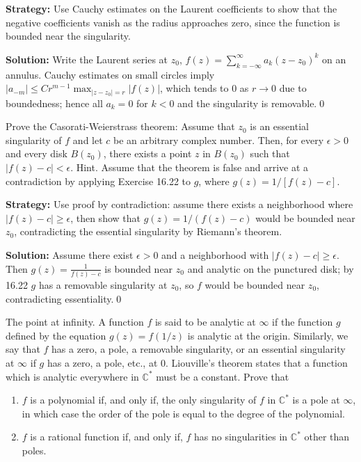 \noindent\textbf{Strategy:} Use Cauchy estimates on the Laurent coefficients to show that the negative coefficients vanish as the radius approaches zero, since the function is bounded near the singularity.

\bigskip\noindent\textbf{Solution:}
Write the Laurent series at $z_0$, $f(z)=\sum_{k=-\infty}^{\infty} a_k(z-z_0)^k$ on an annulus. Cauchy estimates on small circles imply $|a_{-m}|\le C r^{m-1}\max_{|z-z_0|=r}|f(z)|$, which tends to $0$ as $r\to0$ due to boundedness; hence all $a_{k}=0$ for $k<0$ and the singularity is removable.\qed


\begin{problembox}
\begin{problemstatement}
Prove the Casorati-Weierstrass theorem: Assume that \( z_0 \) is an essential singularity of \( f \) and let \( c \) be an arbitrary complex number. Then, for every \( \epsilon > 0 \) and every disk \( B(z_0) \), there exists a point \( z \) in \( B(z_0) \) such that \( |f(z) - c| < \epsilon \). Hint. Assume that the theorem is false and arrive at a contradiction by applying Exercise 16.22 to \( g \), where \( g(z) = 1/[f(z) - c] \).
\end{problemstatement}
\end{problembox}

\noindent\textbf{Strategy:} Use proof by contradiction: assume there exists a neighborhood where \( |f(z) - c| \geq \epsilon \), then show that \( g(z) = 1/(f(z) - c) \) would be bounded near \( z_0 \), contradicting the essential singularity by Riemann's theorem.

\bigskip\noindent\textbf{Solution:}
Assume there exist $\epsilon>0$ and a neighborhood with $|f(z)-c|\ge\epsilon$. Then $g(z)=\frac{1}{f(z)-c}$ is bounded near $z_0$ and analytic on the punctured disk; by 16.22 $g$ has a removable singularity at $z_0$, so $f$ would be bounded near $z_0$, contradicting essentiality.\qed


\begin{problembox}
\begin{problemstatement}
The point at infinity. A function \( f \) is said to be analytic at \( \infty \) if the function \( g \) defined by the equation \( g(z) = f(1/z) \) is analytic at the origin. Similarly, we say that \( f \) has a zero, a pole, a removable singularity, or an essential singularity at \( \infty \) if \( g \) has a zero, a pole, etc., at 0. Liouville's theorem states that a function which is analytic everywhere in \( \mathbb{C}^* \) must be a constant. Prove that
\begin{enumerate}[label=(\alph*)]
\item \( f \) is a polynomial if, and only if, the only singularity of \( f \) in \( \mathbb{C}^* \) is a pole at \( \infty \), in which case the order of the pole is equal to the degree of the polynomial.
\item \( f \) is a rational function if, and only if, \( f \) has no singularities in \( \mathbb{C}^* \) other than poles.
\end{enumerate}
\end{problemstatement}
\end{problembox}

